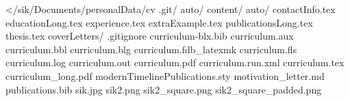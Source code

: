 </sik/Documents/personalData/cv
 .git/
 auto/
 content/
   auto/
   contactInfo.tex
   educationLong.tex
   experience.tex
   extraExample.tex
   publicationsLong.tex
   thesis.tex
 coverLetters/
 .gitignore
 curriculum-blx.bib
 curriculum.aux
 curriculum.bbl
 curriculum.blg
 curriculum.fdb_latexmk
 curriculum.fls
 curriculum.log
 curriculum.out
 curriculum.pdf
 curriculum.run.xml
 curriculum.tex
 curriculum_long.pdf
 modernTimelinePublications.sty
 motivation_letter.md
 publications.bib
 sik.jpg
 sik2.png
 sik2_square.png
 sik2_square_padded.png
